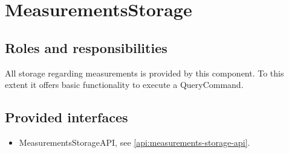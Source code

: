 \section{MeasurementsStorage}
\label{element:measurements-storage}

\subsection{Roles and responsibilities}

\npar All storage regarding measurements is provided by this component. To this
extent it offers basic functionality to execute a QueryCommand. 

\subsection{Provided interfaces}

\begin{itemize}
  \item MeasurementsStorageAPI, see \ref{api:measurements-storage-api}.
\end{itemize}



